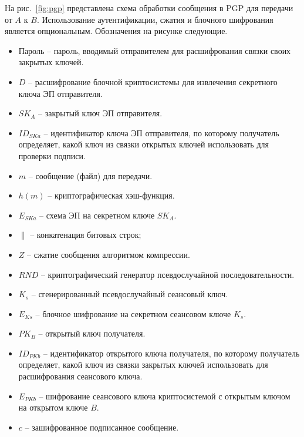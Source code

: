 На рис.~\ref{fig:pgp} представлена схема обработки сообщения в PGP для передачи от $A$ к $B$. Использование аутентификации, сжатия и блочного шифрования является опциональным. Обозначения на рисунке следующие.
\begin{itemize}
    \item Пароль -- пароль, вводимый отправителем для расшифрования связки своих закрытых ключей.
    \item $D$ -- расшифрование блочной криптосистемы для извлечения секретного ключа ЭП отправителя.
    \item $SK_A$ -- закрытый ключ ЭП отправителя.
    \item $ID_{SKa}$ -- идентификатор ключа ЭП отправителя, по которому получатель определяет, какой ключ из связки открытых ключей использовать для проверки подписи.
    \item $m$ -- сообщение (файл) для передачи.
    \item $h(m)$ -- криптографическая хэш-функция.
    \item $E_{SKa}$ -- схема ЭП на секретном ключе $SK_A$.
    \item $\|$ -- конкатенация битовых строк;
    \item $Z$ -- сжатие сообщения алгоритмом компрессии.
    \item $RND$ -- криптографический генератор псевдослучайной последовательности.
    \item $K_s$ -- сгенерированный псевдослучайный сеансовый ключ.
    \item $E_{Ks}$ -- блочное шифрование на секретном сеансовом ключе $K_s$.
    \item $PK_B$ -- открытый ключ получателя.
    \item $ID_{PKb}$ -- идентификатор открытого ключа получателя, по которому получатель определяет, какой ключ из связки закрытых ключей использовать для расшифрования сеансового ключа.
    \item $E_{PKb}$ -- шифрование сеансового ключа криптосистемой с открытым ключом на открытом ключе $B$.
    \item $c$ -- зашифрованное подписанное сообщение.
\end{itemize}
